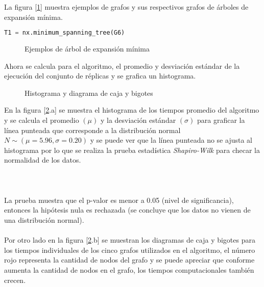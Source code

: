 \documentclass[a4paper, 11pt]{article}
\begin{document}
La figura [\ref{figure4}] muestra ejemplos de grafos y sus respectivos grafos  de árboles de expansión mínima.

\begin{lstlisting}[language=Python]
T1 = nx.minimum_spanning_tree(G6)
\end{lstlisting}

\begin{figure}[H]
\centering
{}
\caption{Ejemplos de árbol de expansión mínima} \label{figure4}
\end{figure}

Ahora se calcula para el algoritmo, el promedio y desviación estándar de la ejecución del conjunto de réplicas y se grafica un histograma.

\begin{figure}[H]
\centering
{}
\caption{Histograma y diagrama de caja y bigotes} \label{figure5}
\end{figure}

En la figura [\ref{figure5}.a] se muestra el histograma de los tiempos promedio del algoritmo y se calcula el promedio $(\mu)$ y la desviación estándar $(\sigma)$ para graficar la línea punteada que corresponde a la distribución normal $N\sim(\mu=5.96, \sigma=0.20)$ y se puede ver que la línea punteada no se ajusta al histograma por lo que se realiza la prueba estadística \textit{Shapiro-Wilk} para checar la normalidad de los datos.
\\
\\
\noindent{}
\\
\\
La prueba muestra que el p-valor es menor a 0.05 (nivel de significancia), entonces la hipótesis nula es rechazada (se concluye que los datos no vienen de una distribución normal).
\\
\\
Por otro lado en la figura [\ref{figure5}.b] se muestran los diagramas de caja y bigotes para los tiempos individuales de los cinco grafos utilizados en el algoritmo, el número rojo representa la cantidad de nodos del grafo y se puede apreciar que conforme aumenta la cantidad de nodos en el grafo, los tiempos computacionales también crecen.
\end{document}
